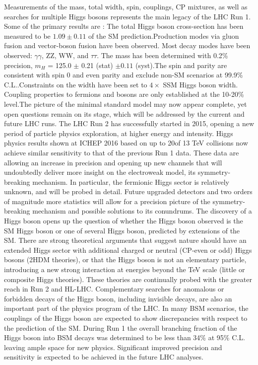 Measurements of the mass, total width, spin, couplings, CP mixtures, as well as searches for
multiple Higgs bosons represents the main legacy of the LHC Run 1. Some
of the primary results are : The total Higgs boson cross-section has
been measured to be $1.09 \pm 0.11$ of the SM prediction.Production modes
via gluon fusion and vector-boson fusion have been observed. Most decay
modes have been observed: $\gamma \gamma$, ZZ, WW, and $\tau\tau$.
The mass has been determined with 0.2\% precision, 
$m_H$ = 125.0 $\pm$ 0.21 (stat) $\pm 0.11$ (syst).The spin and parity are consistent with spin 0 and even parity
and exclude non-SM scenarios at 99.9\% C.L..Constraints on the width
have been set to $4 \times$  SSM Higgs boson width. Coupling
properties to fermions and bosons are only established at the 10-20\%
level.The picture of the minimal standard model may now appear complete,
yet open questions remain on its stage, which will be addressed by the
current and future LHC runs. The LHC Run 2 has successfully started in
2015, opening a new period of particle physics exploration, at higher
energy and intensity. Higgs physics results shown at ICHEP 2016 based on
up to 20\fb of 13 TeV collisions now achieve similar sensitivity to
that of the previous Run 1 data. These data are allowing an increase in
precision and opening up new channels that will undoubtedly deliver more
insight on the electroweak model, its symmetry-breaking mechanism. In
particular, the fermionic Higgs sector is relatively unknown, and will
be probed in detail. Future upgraded detectors and two orders of
magnitude more statistics will allow for a precision picture of the
symmetry-breaking mechanism and possible solutions to its conundrums.
The discovery of a Higgs boson opens up the question of whether the
Higgs boson observed is the SM Higgs boson or one of several Higgs
boson, predicted by extensions of the SM. There are strong theoretical
arguments that suggest nature should have an extended Higgs sector with
additional charged or neutral (CP-even or odd) Higgs bosons (2HDM
theories), or that the Higgs boson is not an elementary particle,
introducing a new strong interaction at energies beyond the TeV scale
(little or composite Higgs theories). These theories are continually
probed with the greater reach in Run 2 and HL-LHC. Complementary
searches for anomalous or forbidden decays of the Higgs boson, including
invisible decays, are also an important part of the physics program of
the LHC. In many BSM scenarios, the couplings of the Higgs boson are
expected to show discrepancies with respect to the prediction of the SM.
During Run 1 the overall branching fraction of the Higgs boson into BSM
decays was determined to be less than 34\% at 95\% C.L. leaving ample
space for new physics. Significant improved precision and sensitivity is
expected to be achieved in the future LHC analyses.